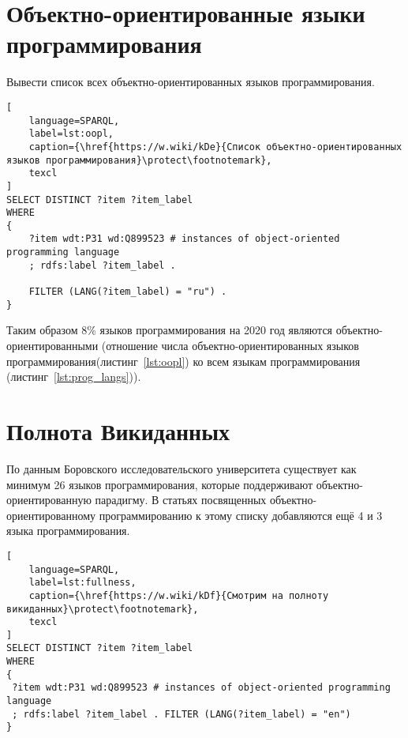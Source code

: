 \section{Объектно-ориентированные языки программирования}
Вывести список всех объектно-ориентированных языков программирования.

\begin{lstlisting}[
	language=SPARQL,
	label=lst:oopl,
	caption={\href{https://w.wiki/kDe}{Список объектно-ориентированных языков программирования}\protect\footnotemark},
	texcl
]
SELECT DISTINCT ?item ?item_label
WHERE
{
    ?item wdt:P31 wd:Q899523 # instances of object-oriented programming language
    ; rdfs:label ?item_label . 

    FILTER (LANG(?item_label) = "ru") . 
}
\end{lstlisting}


Таким образом 8\% языков программирования на 2020 год являются объектно-ориентированными (отношение числа объектно-ориентированных языков программирования(листинг~\ref{lst:oopl}) ко всем языкам программирования (листинг~\ref{lst:prog_langs})).

\section{Полнота Викиданных}
По данным Боровского исследовательского университета\cite{obj_orient_langs_bourabai} существует как минимум 26 языков программирования, которые поддерживают объектно-ориентированную парадигму. В статьях посвященных объектно-ориентированному программированию к этому списку добавляются ещё 4\cite{oo_langs_science_wikia} и 3\cite{oo_langs_garshin} языка программирования.

\begin{lstlisting}[
	language=SPARQL,
	label=lst:fullness,
	caption={\href{https://w.wiki/kDf}{Смотрим на полноту викиданных}\protect\footnotemark},
	texcl
]
SELECT DISTINCT ?item ?item_label
WHERE
{
 ?item wdt:P31 wd:Q899523 # instances of object-oriented programming language
 ; rdfs:label ?item_label . FILTER (LANG(?item_label) = "en")
}
\end{lstlisting}

